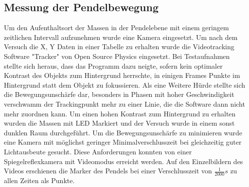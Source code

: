\subsection{Messung der Pendelbewegung}
Um den Aufenthaltsort der Massen in der Pendelebene mit einem geringem zeitlichen Intervall aufzunehmen wurde eine Kamera eingesetzt. Um nach dem Versuch die X, Y Daten in einer Tabelle zu erhalten wurde die Videotracking Software "Tracker" von Open Source Physics eingesetzt.
Bei Testaufnahmen stellte sich heraus, dass das Programm dazu neigte, sofern kein optimaler Kontrast des Objekts zum Hintergrund herrschte, in einigen Frames Punkte im Hintergrund statt dem Objekt zu fokussieren. Als eine Weitere Hürde stellte sich die Bewegungsunschärfe dar, besonders in Phasen mit hoher Geschwindigkeit verschwamm der Trackingpunkt mehr zu einer Linie, die die Software dann nicht mehr zuordnen kann. Um einen hohen Kontrast zum Hintergrund zu erhalten wurden die Massen mit LED Markiert und der Versuch wurde in einem sonst dunklen Raum durchgeführt. Um die Bewegungsunschärfe zu minimieren wurde eine Kamera mit möglichst geringer Minimalverschlusszeit bei gleichzeitig guter Lichtausbeute gesucht. Diese Anforderungen konnten von einer Spiegelreflexkamera mit Videomodus erreicht werden. Auf den Einzelbildern des Videos erschienen die Marker des Pendels bei einer Verschlusszeit von $\frac{1}{2000} s$ zu allen Zeiten als Punkte.

